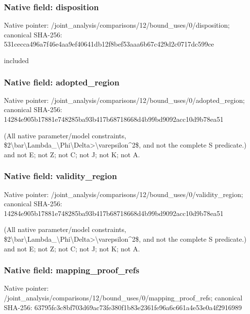 \documentclass[10pt,a4paper]{article}
\begin{document}
\subsubsection{Native field: disposition}


Native pointer: /joint\_analysis/comparis\allowbreak{}ons/12/bound\_uses/0/disp\allowbreak{}osition; canonical SHA-256: 531cecca496a7f46e4aa9ef4\allowbreak{}0641db12f8bef53aaa6b67c4\allowbreak{}29d2c0717dc599ce


included


\subsubsection{Native field: adopted\_region}


Native pointer: /joint\_analysis/comparis\allowbreak{}ons/12/bound\_uses/0/adop\allowbreak{}ted\_region; canonical SHA-256: 14284e905b17881e748285ba\allowbreak{}93b417b68718668d4b99bd90\allowbreak{}92acc10d9b78ea51


(All native parameter/model constraints, \$2\textbackslash{}bar\textbackslash{}Lambda\_\textbackslash{}Phi\textbackslash{}Delta\allowbreak{}>\textbackslash{}varepsilon\textasciicircum{}2\$, and not the complete S predicate.) and not E; not Z; not C; not J; not K; not A.


\subsubsection{Native field: validity\_region}


Native pointer: /joint\_analysis/comparis\allowbreak{}ons/12/bound\_uses/0/vali\allowbreak{}dity\_region; canonical SHA-256: 14284e905b17881e748285ba\allowbreak{}93b417b68718668d4b99bd90\allowbreak{}92acc10d9b78ea51


(All native parameter/model constraints, \$2\textbackslash{}bar\textbackslash{}Lambda\_\textbackslash{}Phi\textbackslash{}Delta\allowbreak{}>\textbackslash{}varepsilon\textasciicircum{}2\$, and not the complete S predicate.) and not E; not Z; not C; not J; not K; not A.


\subsubsection{Native field: mapping\_proof\_refs}


Native pointer: /joint\_analysis/comparis\allowbreak{}ons/12/bound\_uses/0/mapp\allowbreak{}ing\_proof\_refs; canonical SHA-256: 63795fc3c8bf703d69ac73fe\allowbreak{}380f1b83e2361fe96a6c661a\allowbreak{}4e53e0a4f2916989
\end{document}
